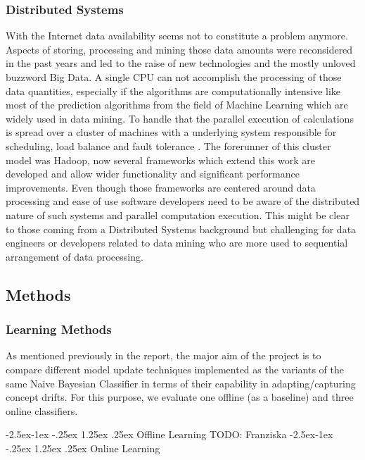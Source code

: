 \documentclass[12pt]{article}
\makeatletter
\renewcommand\paragraph{\@startsection{paragraph}{4}{\z@}%
            {-2.5ex\@plus -1ex \@minus -.25ex}%
            {1.25ex \@plus .25ex}%
            {\normalfont\normalsize\bfseries}}
\makeatother
\begin{document}
\subsubsection{Distributed Systems}
With the Internet data availability seems not to constitute a problem anymore. Aspects of storing, processing and mining those data amounts were reconsidered in the past years and led to the raise of new technologies and the mostly unloved buzzword Big Data. A single CPU can not accomplish the processing of those data quantities, especially if the algorithms are computationally intensive like most of the prediction algorithms from the field of Machine Learning which are widely used in data mining. To handle that  the parallel execution of calculations is spread over a cluster of machines with a underlying system responsible for scheduling, load balance and fault tolerance \citep[p. 10]{zaharia2010} . The forerunner of this cluster model was Hadoop, now several frameworks which extend this work are developed and allow wider functionality and significant performance improvements. Even though those frameworks are centered around data processing and ease of use software developers need to be aware of the distributed nature of such systems and parallel computation execution. This might be clear to those coming from a Distributed Systems background but challenging for data engineers or developers related to data mining who are more used to sequential arrangement of data processing.  

\subsection{Methods}
\subsubsection{Learning Methods}
As mentioned previously in the report, the major aim of the project is to compare different model update techniques implemented as the variants of the same Naive Bayesian Classifier in terms of their capability in adapting/capturing concept drifts. For this purpose, we evaluate one offline (as a baseline) and three online classifiers.

\paragraph{Offline Learning}
TODO: Franziska
\paragraph{Online Learning}
\end{document}
